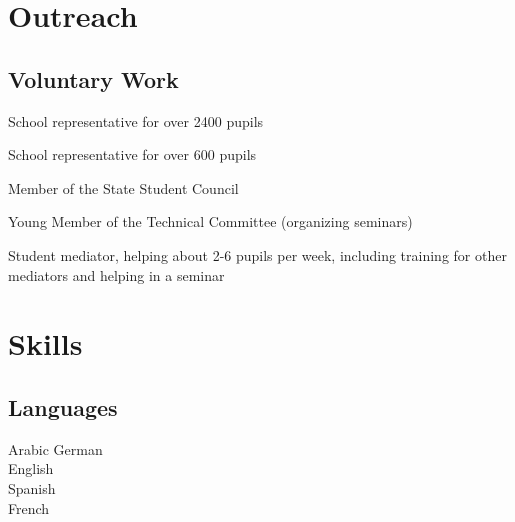 \begin{minipage}[t]{0.63\textwidth}
\section{Outreach}
\subsection{Voluntary Work} 
\vspace{\topsep}
\begin{tightemize}
\item School representative for over 2400 pupils
\end{tightemize}
\begin{tightemize}
\item School representative for over 600 pupils  
\item  Member of the State Student Council
\end{tightemize}
\begin{tightemize}
\item Young Member of the Technical Committee (organizing seminars)
\end{tightemize}
\begin{tightemize}
\item Student mediator, helping about 2-6 pupils per week, including training for other mediators and helping in a seminar
\end{tightemize}
\end{minipage}
\begin{minipage}[t]{0.15\textwidth}

\section{Skills}

\subsection{Languages}
{}
Arabic \textbullet{} German \\
{}
English \\
\sectionsep
{}
Spanish \\
French \\
\end{minipage}
